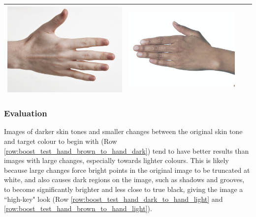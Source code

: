 \begin{longtable}{|c||c|c|c|}
\begin{minipage}{.29\textwidth}
    \includegraphics[width=\textwidth,height=\textheight,keepaspectratio]{../inputs/hand_pale.jpg}
  \end{minipage} & 
  \begin{minipage}{.29\textwidth}
    \includegraphics[width=\textwidth,height=\textheight,keepaspectratio]{../rc_test/outputs/20170516_boost_test/hand_brown_to_hand_pale.jpg}
  \end{minipage} \\
    \hline
\end{longtable}

\subsubsection*{Evaluation}
Images of darker skin tones and smaller changes between the original skin tone and target colour to begin with (Row \ref{row:boost_test_hand_brown_to_hand_dark}) tend to have better results than images with large changes, especially towards lighter colours. This is likely because large changes force bright points in the original image to be truncated at white, and also causes dark regions on the image, such as shadows and grooves, to become significantly brighter and less close to true black, giving the image a ``high-key" look (Row \ref{row:boost_test_hand_dark_to_hand_light} and \ref{row:boost_test_hand_brown_to_hand_light}).

